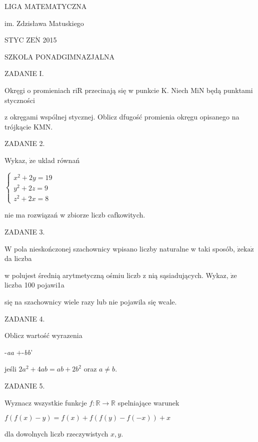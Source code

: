 \documentclass[a4paper,12pt]{article}
\begin{document}
LIGA MATEMATYCZNA

im. Zdzisława Matuskiego

STYC Z$\mathrm{E}\acute{\mathrm{N}}$ 2015

SZKOLA PONADGIMNAZJALNA

ZADANIE I.

Okręgi o promieniach riR przecinają się w punkcie K. Niech MiN będą punktami styczności

z okręgami wspólnej stycznej. Oblicz dfugość promienia okręgu opisanego na trójkącie KMN.

ZADANIE 2.

Wykaz, $\dot{\mathrm{z}}\mathrm{e}$ uklad równań

$\left\{\begin{array}{l}
x^{2}+2y=19\\
y^{2}+2z=9\\
z^{2}+2x=8
\end{array}\right.$

nie ma rozwiązań w zbiorze liczb cafkowitych.

ZADANIE 3.

$\mathrm{W}$ pola nieskończonej szachownicy wpisano liczby naturalne w taki sposób, $\dot{\mathrm{z}}\mathrm{e} \mathrm{k}\mathrm{a}\dot{\mathrm{z}}$ da liczba

w polujest średnią arytmetyczną ośmiu liczb z nią sąsiadujących. Wykaz, $\dot{\mathrm{z}}\mathrm{e}$ liczba 100 pojawi1a

się na szachownicy wiele razy lub nie pojawila się wcale.

ZADANIE 4.

Oblicz wartość wyrazenia

-{\it aa} $+$-{\it bb}'

jeśli $2a^{2}+4ab=ab+2b^{2}$ oraz $a\neq b.$

ZADANIE 5.

Wyznacz wszystkie funkcje $f:\mathbb{R}\rightarrow \mathbb{R}$ spelniające warunek

$f(f(x)-y)=f(x)+f(f(y)-f(-x))+x$

dla dowolnych liczb rzeczywistych $x, y.$
\end{document}
